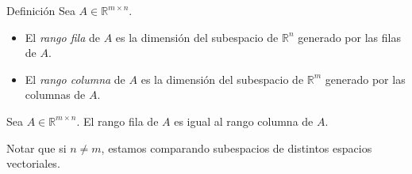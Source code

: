 \documentclass[handout]{beamer} %
\newcommand{\R}{\mathbb R}
\newcommand{\K}{\mathbb K}
\begin{document}

\begin{frame}


\begin{exampleblock}{Definición}
Sea $A\in\R^{m\times n}$.  \pause
\begin{itemize}
 \item El \textit{rango fila} de $A$ es la dimensión del subespacio de $\R^n$ generado por las filas de $A$.\pause
 \item El \textit{rango columna} de $A$ es la dimensión del subespacio de $\R^m$ generado por las columnas de $A$.
\end{itemize}
\end{exampleblock}\pause



\begin{teorema}\label{th-rango-fila-columna}
Sea $A\in\R^{m\times n}$. El rango fila de $A$ es igual al rango columna de $A$.
\end{teorema}\pause

Notar que si $n\neq m$, estamos comparando subespacios de distintos espacios vectoriales.

\

\end{frame}
\end{document}
